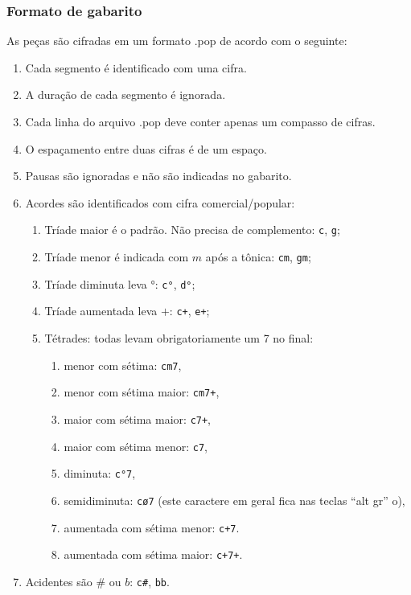 \documentclass[12pt,brazil]{book}
\begin{document}
\subsubsection{Formato de gabarito}
\label{sec:formato-de-gabarito}

As peças são cifradas em um formato .pop de acordo com o seguinte:

\begin{enumerate}
\item Cada segmento é identificado com uma cifra.
\item A duração de cada segmento é ignorada.
\item Cada linha do arquivo .pop deve conter apenas um compasso de
  cifras.
\item O espaçamento entre duas cifras é de um espaço.
\item Pausas são ignoradas e não são indicadas no gabarito.
\item Acordes são identificados com cifra comercial/popular:
  \begin{enumerate}
  \item Tríade maior é o padrão. Não precisa de complemento:
    \texttt{c}, \texttt{g};
  \item Tríade menor é indicada com $m$ após a tônica: \texttt{cm},
    \texttt{gm};
  \item Tríade diminuta leva $°$: \texttt{c°}, \texttt{d°};
  \item Tríade aumentada leva $+$: \texttt{c+}, \texttt{e+};
  \item Tétrades: todas levam obrigatoriamente um 7 no final:
    \begin{enumerate}
    \item menor com sétima: \texttt{cm7},
    \item menor com sétima maior: \texttt{cm7+},
    \item maior com sétima maior: \texttt{c7+},
    \item maior com sétima menor: \texttt{c7},
    \item diminuta: \texttt{c°7},
    \item semidiminuta: \texttt{cø7} (este caractere em geral fica nas
      teclas ``alt gr'' o),
    \item aumentada com sétima menor: \texttt{c+7}.
    \item aumentada com sétima maior: \texttt{c+7+}.
    \end{enumerate}
  \end{enumerate}
  \item Acidentes são $\#$ ou $b$: \texttt{c\#}, \texttt{bb}.

\end{enumerate}
\end{document}
